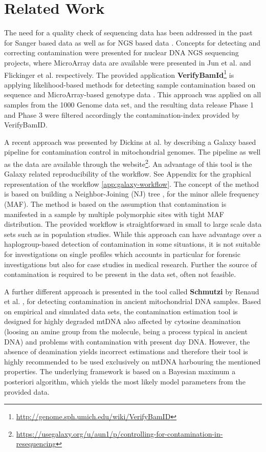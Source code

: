 \section{Related Work}\label{cont:relatedwork}
The need for a quality check of sequencing data has been addressed in the past for Sanger based data \cite{Walker2004, Montesino2007, Bandelt2009, Yao2007} as well as for NGS based data \cite{Holland2011}. 
Concepts for detecting and correcting contamination were presented for nuclear DNA NGS sequencing projects, where MicroArray data are available were presented in Jun et al. \cite{Jun2012} and Flickinger et al. \cite{Flickinger2015} respectively. The provided application \textbf{VerifyBamId}\footnote{\url{http://genome.sph.umich.edu/wiki/VerifyBamID}} is applying likelihood-based methods for detecting sample contamination based on sequence and MicroArray-based genotype data \cite{Jun2012}. This approach was applied on all samples from the 1000 Genome data set, and the resulting data release Phase 1 and Phase 3 were filtered accordingly the contamination-index provided by VerifyBamID. 

A recent approach was presented by Dickins at al. \cite{Dickins2014} by describing a Galaxy \cite{Goecks2010,Afgan2016} based pipeline for contamination control in mitochondrial genomes. The pipeline as well as the data are available through the website\footnote{\url{https://usegalaxy.org/u/aun1/p/controlling-for-contamination-in-resequencing}}. An advantage of this tool is the Galaxy related reproducibility of the workflow. See Appendix for the graphical representation of the workflow \ref{app:galaxy-workflow}. The concept of the method is based on building a Neighbor-Joining (NJ) tree \cite{Saitou1987}, for the minor allele frequency (MAF). The method is based on the assumption that contamination is manifested in a sample by multiple polymorphic sites with tight MAF distribution. The provided workflow is straightforward in small to large scale data sets such as in population studies. While this approach can have advantage over a haplogroup-based detection of contamination in some situations, it is not suitable for investigations on single profiles which accounts in particular for forensic investigations but also for case studies in medical research. Further the source of contamination is required to be present in the data set, often not feasible.

A further different approach is presented in the tool called \textbf{Schmutzi} by Renaud et al. \cite{Renaud2015}, for detecting contamination in ancient mitochondrial DNA samples. Based on empirical and simulated data sets, the contamination estimation tool is designed for highly degraded mtDNA also affected by cytosine deamination (loosing an amine group from the molecule, being  a process typical in ancient DNA) and problems with contamination with present day DNA.  However, the absence of deamination yields incorrect estimations and therefore their tool is highly recommended to be used exclusively on mtDNA harbouring the mentioned properties. The underlying framework is based on a Bayesian maximum a posteriori algorithm, which yields the most likely model parameters from the provided data. 

